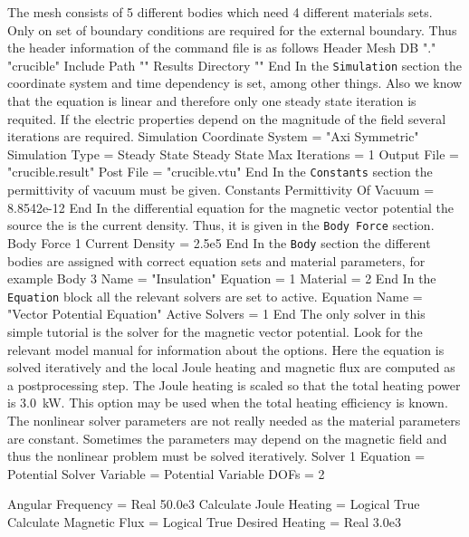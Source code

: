 The mesh consists of 5 different bodies which need 4
different materials sets. Only on set of boundary conditions 
are required for the external boundary. Thus the header 
information of the command file is as follows
\ttbegin
Header
  Mesh DB "." "crucible"
  Include Path ""
  Results Directory ""
End
\ttend
%
In the \texttt{Simulation} section the coordinate system and
time dependency is set, among other things. Also we know that
the equation is linear and therefore only one steady state
iteration is requited. If the electric properties depend on 
the magnitude of the field several iterations are required.
\ttbegin
Simulation
  Coordinate System = "Axi Symmetric"
  Simulation Type = Steady State
  Steady State Max Iterations = 1
  Output File = "crucible.result"
  Post File = "crucible.vtu"
End
\ttend
%
In the \texttt{Constants} section the permittivity of 
vacuum must be given.
\ttbegin
Constants
  Permittivity Of Vacuum = 8.8542e-12
End
\ttend
%
In the differential equation for the magnetic vector potential the 
source the is the current density. Thus, it is given in the
\texttt{Body Force} section. 
\ttbegin
Body Force 1
  Current Density = 2.5e5
End
\ttend
%
In the \texttt{Body} section the different bodies are assigned 
with correct equation sets and material parameters, for example
\ttbegin
Body 3
  Name = "Insulation"
  Equation = 1
  Material = 2
End
\ttend
%
In the \texttt{Equation} block all the relevant solvers are 
set to active.
\ttbegin
Equation
  Name = "Vector Potential Equation"
  Active Solvers = 1
End
\ttend
%
The only solver in this simple tutorial is the solver for the magnetic
vector potential. Look for the relevant model manual for information
about the options. Here the equation is solved iteratively and the
local Joule heating and magnetic flux are computed as a postprocessing
step. The Joule heating is scaled so that the total heating power is
3.0~kW. This option may be used when the total heating efficiency is
known.  The nonlinear solver parameters are not really needed as the
material parameters are constant. Sometimes the parameters may depend
on the magnetic field and thus the nonlinear problem must be solved
iteratively.
%
\ttbegin
Solver 1
  Equation = Potential Solver
  Variable = Potential
  Variable DOFs = 2

  Angular Frequency = Real 50.0e3
  Calculate Joule Heating = Logical True
  Calculate Magnetic Flux = Logical True
  Desired Heating = Real 3.0e3

